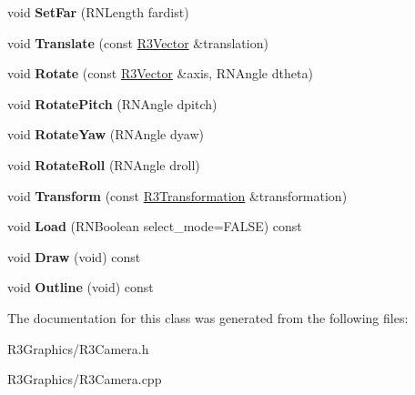 \begin{DoxyCompactItemize}
\item 
void {\bfseries Set\+Far} (R\+N\+Length fardist)\hypertarget{class_r3_camera_aa58204f9bc03f23c891109301e41ae0c}{}\label{class_r3_camera_aa58204f9bc03f23c891109301e41ae0c}

\item 
void {\bfseries Translate} (const \hyperlink{class_r3_vector}{R3\+Vector} \&translation)\hypertarget{class_r3_camera_acde2f9943694dc08fb18326f2b6b622c}{}\label{class_r3_camera_acde2f9943694dc08fb18326f2b6b622c}

\item 
void {\bfseries Rotate} (const \hyperlink{class_r3_vector}{R3\+Vector} \&axis, R\+N\+Angle dtheta)\hypertarget{class_r3_camera_a996ea9491b1c7994bae28dade020148f}{}\label{class_r3_camera_a996ea9491b1c7994bae28dade020148f}

\item 
void {\bfseries Rotate\+Pitch} (R\+N\+Angle dpitch)\hypertarget{class_r3_camera_ae94fd682bea9d2a27355f56543a4ee45}{}\label{class_r3_camera_ae94fd682bea9d2a27355f56543a4ee45}

\item 
void {\bfseries Rotate\+Yaw} (R\+N\+Angle dyaw)\hypertarget{class_r3_camera_ac3f57cc40f592c2b9485f43cf3c5dda3}{}\label{class_r3_camera_ac3f57cc40f592c2b9485f43cf3c5dda3}

\item 
void {\bfseries Rotate\+Roll} (R\+N\+Angle droll)\hypertarget{class_r3_camera_ab2d53d932ba486aa3ec9dfdb52bd867b}{}\label{class_r3_camera_ab2d53d932ba486aa3ec9dfdb52bd867b}

\item 
void {\bfseries Transform} (const \hyperlink{class_r3_transformation}{R3\+Transformation} \&transformation)\hypertarget{class_r3_camera_a293794de29a71b2866b1cf2e794422f0}{}\label{class_r3_camera_a293794de29a71b2866b1cf2e794422f0}

\item 
void {\bfseries Load} (R\+N\+Boolean select\+\_\+mode=F\+A\+L\+SE) const \hypertarget{class_r3_camera_ab33808c4effe5ec426e1135355783056}{}\label{class_r3_camera_ab33808c4effe5ec426e1135355783056}

\item 
void {\bfseries Draw} (void) const \hypertarget{class_r3_camera_a4019a6e50fc04b986499d01f39f0d711}{}\label{class_r3_camera_a4019a6e50fc04b986499d01f39f0d711}

\item 
void {\bfseries Outline} (void) const \hypertarget{class_r3_camera_aeb6e0451ede15559755bee0913514cbc}{}\label{class_r3_camera_aeb6e0451ede15559755bee0913514cbc}

\end{DoxyCompactItemize}


The documentation for this class was generated from the following files\+:\begin{DoxyCompactItemize}
\item 
R3\+Graphics/R3\+Camera.\+h\item 
R3\+Graphics/R3\+Camera.\+cpp\end{DoxyCompactItemize}
